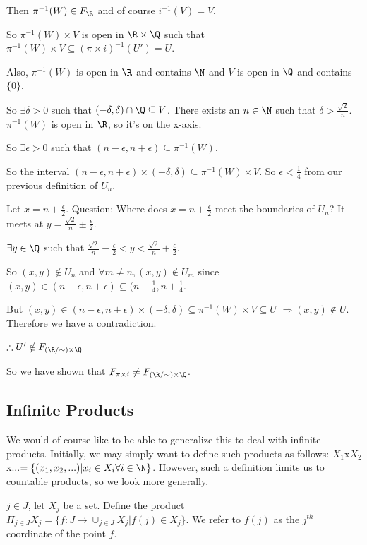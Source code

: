 Then $\pi^{-1}(W) \in F_{\R}$ and of course $i^{-1}(V) = V$.

So $\pi^{-1}(W) \times V$ is open in $\R\times \Q$ such that $\pi^{-1}(W) \times V \subseteq (\pi \times i)^{-1}(U') = U$.

Also, $\pi^{-1}(W)$ is open in $\R$ and contains $\N$ and $V$ is open in $\Q$ and contains $\{0\}$.

So $\exists \delta >0$ such that $(-\delta, \delta) \cap \Q \subseteq V$. There exists an $n\in \N$ such that $\delta > \frac{\sqrt{2}}{n}$. $\pi^{-1}(W)$ is open in $\R$, so it's on the x-axis.

So $\exists \epsilon >0$ such that $(n-\epsilon, n+\epsilon)\subseteq \pi^{-1}(W)$.

So the interval $(n-\epsilon, n+\epsilon)\times (-\delta, \delta)\subseteq \pi^{-1}(W)\times V$. So $\epsilon < \frac{1}{4}$ from our previous definition of $U_n$.

Let $x = n + \frac{\epsilon}{2}$. Question: Where does $x = n + \frac{\epsilon}{2}$ meet the boundaries of $U_n$? It meets at $y = \frac{\sqrt{2}}{n} \pm \frac{\epsilon}{2}$.

$\exists y \in \Q$ such that $\frac{\sqrt{2}}{n} - \frac{\epsilon}{2} < y < \frac{\sqrt{2}}{n} + \frac{\epsilon}{2}$.

So $(x,y) \notin U_n$ and $\forall m\neq n, (x,y)\notin U_m$ since $(x,y) \in (n-\epsilon, n+\epsilon)\subseteq (n-\frac{1}{4}, n+\frac{1}{4}$.

But $(x,y) \in (n-\epsilon, n+\epsilon) \times (-\delta, \delta) \subseteq \pi^{-1}(W) \times V \subseteq U$ $\Rightarrow (x,y) \notin U$. Therefore we have a contradiction.

$\therefore U' \notin F_{(\R/\sim)\times \Q}$

So we have shown that $F_{\pi\times i} \neq F_{(\R/\sim) \times \Q}$.

\subsection{Infinite Products}
We would of course like to be able to generalize this to deal with infinite products.  Initially, we may simply want to define such products as follows: $X_1$x$X_2$x...$=\{(x_1,x_2,...)|x_i \in X_i \forall i \in \N \}$.  However, such a definition limits us to countable products, so we look more generally.

\begin{definition}
 $j \in J$, let $X_j$ be a set.  Define the product $\Pi_{j \in J} X_j = \{f:J \rightarrow \cup_{j \in J}X_j|f(j) \in X_j\}.$  We refer to $f(j)$ as the $j^{th}$ coordinate of the point $f$.
\end{definition}

